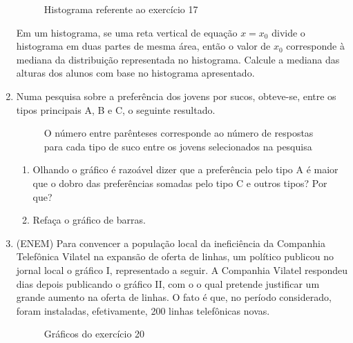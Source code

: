 \begin{enumerate}
\begin{figure}[H]
\centering
\capstart

\noindent{}
\caption{Histograma referente ao exercício 17}\label{\detokenize{PE103-E:id10}}\label{\detokenize{PE103-E:id27}}\end{figure}

Em um histograma, se uma reta vertical de equação \(x=x_0\) divide o histograma em duas partes de mesma área, então o valor de \(x_0\) corresponde à mediana da distribuição representada no histograma. Calcule a mediana das alturas dos alunos com base no histograma apresentado.

\item Numa pesquisa sobre a preferência dos jovens por sucos, obteve-se, entre os tipos principais A, B e C, o seguinte resultado.

\begin{figure}[H]
\centering
\capstart

\noindent{}
\caption{O número entre parênteses corresponde ao número de respostas para cada tipo de suco entre os jovens selecionados na pesquisa}\label{\detokenize{PE103-E:id11}}\label{\detokenize{PE103-E:id28}}\end{figure}
\begin{enumerate}
\item {} 
Olhando o gráfico é razoável dizer que a preferência pelo tipo A é maior que o dobro das preferências somadas pelo tipo C e outros tipos? Por que?

\item {} 
Refaça o gráfico de barras.

\end{enumerate}

\item (ENEM) Para convencer a população local da ineficiência da Companhia Telefônica Vilatel na expansão de oferta de linhas, um político publicou no jornal local o gráfico I, representado a seguir. A Companhia Vilatel respondeu dias depois publicando o gráfico II, com o o qual pretende justificar um grande aumento na oferta de linhas. O fato é que, no período considerado, foram instaladas, efetivamente, 200 linhas telefônicas novas.

\begin{figure}[H]
\centering
\capstart

\noindent{}
\caption{Gráficos do exercício 20}\label{\detokenize{PE103-E:id12}}\label{\detokenize{PE103-E:id29}}\end{figure}


\end{enumerate}
